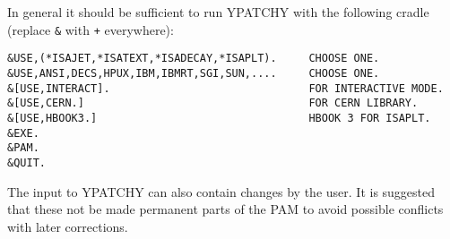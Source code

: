       In general it should be sufficient to run YPATCHY with the
following cradle (replace \verb|&| with \verb|+| everywhere):
\begin{verbatim}
&USE,(*ISAJET,*ISATEXT,*ISADECAY,*ISAPLT).     CHOOSE ONE.
&USE,ANSI,DECS,HPUX,IBM,IBMRT,SGI,SUN,....     CHOOSE ONE.
&[USE,INTERACT].                               FOR INTERACTIVE MODE.
&[USE,CERN.]                                   FOR CERN LIBRARY.
&[USE,HBOOK3.]                                 HBOOK 3 FOR ISAPLT.
&EXE.
&PAM.
&QUIT.
\end{verbatim}

      The input to YPATCHY can also contain changes by the user. It is
suggested that these not be made permanent parts of the PAM to avoid
possible conflicts with later corrections.
